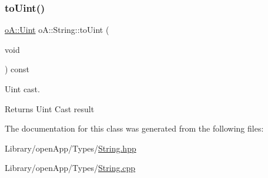 \subsubsection{\texorpdfstring{to\+Uint()}{toUint()}}
{\footnotesize\ttfamily \mbox{\hyperlink{namespaceo_a_abe1d8250226c5cf34f84d7b75fc7922e}{o\+A\+::\+Uint}} o\+A\+::\+String\+::to\+Uint (\begin{DoxyParamCaption}\item[{void}]{ }\end{DoxyParamCaption}) const}



Uint cast. 

\begin{DoxyReturn}{Returns}
Uint Cast result 
\end{DoxyReturn}


The documentation for this class was generated from the following files\+:\begin{DoxyCompactItemize}
\item 
Library/open\+App/\+Types/\mbox{\hyperlink{_string_8hpp}{String.\+hpp}}\item 
Library/open\+App/\+Types/\mbox{\hyperlink{_string_8cpp}{String.\+cpp}}\end{DoxyCompactItemize}
